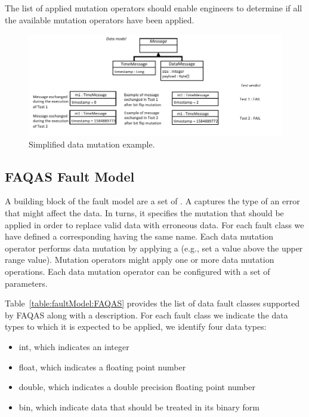 The list of applied mutation operators should enable engineers to determine if all the available mutation operators have been applied.


\begin{figure}[t!]
  \centering
    \includegraphics{images/DataDrivenSimpleExample}
      \caption{Simplified data mutation example.}
      \label{fig:DataDrivenSimpleExample}
\end{figure}

\clearpage



\clearpage
\subsection{FAQAS Fault Model}
\label{sec:dataModel}
\label{sec:faultModel}





A building block of the fault model are a set of .
A   captures the type of an error that might affect the data. In turns, it specifies the mutation that should be applied in order to replace valid data with erroneous data. For each fault class we have defined a corresponding  having the same name. 
Each {data mutation operator} performs data mutation by applying a  (e.g., set a value above the upper range value). Mutation operators might apply one or more data mutation operations.
Each data mutation operator can be configured with a set of parameters. 

Table~\ref{table:faultModel:FAQAS} provides the list of data fault classes supported by FAQAS along with a description. For each fault class we indicate the data types to which it is expected to be applied, we identify four data types: 
\begin{itemize}
\item int, which indicates an integer
\item float, which indicates a floating point number
\item double, which indicates a double precision floating point number
\item bin, which indicate data that should be treated in its binary form
\end{itemize}


